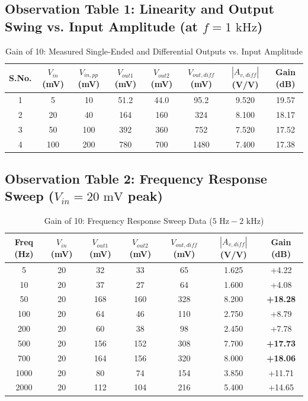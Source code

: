 \documentclass[11pt,a4paper]{article}
\begin{document}
\subsection{Observation Table 1: Linearity and Output Swing vs. Input Amplitude (at $f = 1\text{ kHz}$)}
\begin{table}[H]
\centering
\caption{Gain of 10: Measured Single-Ended and Differential Outputs vs. Input Amplitude}
\label{tab:gain10_vin}
\begin{tabular}{@{}cccccccc@{}}
\toprule
\textbf{S.No.} & \textbf{$V_{in}$ (mV)} & \textbf{$V_{in,pp}$ (mV)} & \textbf{$V_{out1}$ (mV)} & \textbf{$V_{out2}$ (mV)} & \textbf{$V_{out,diff}$ (mV)} & \textbf{$|A_{v,diff}|$ (V/V)} & \textbf{Gain (dB)} \\ \midrule
1 & 5   & 10  & 51.2 & 44.0 & 95.2  & 9.520 & 19.57 \\
2 & 20  & 40  & 164  & 160  & 324   & 8.100 & 18.17 \\
3 & 50  & 100 & 392  & 360  & 752   & 7.520 & 17.52 \\
4 & 100 & 200 & 780  & 700  & 1480  & 7.400 & 17.38 \\ \bottomrule
\end{tabular}
\end{table}

\subsection{Observation Table 2: Frequency Response Sweep ($V_{in} = 20\text{ mV}$ peak)}
\begin{table}[H]
\centering
\caption{Gain of 10: Frequency Response Sweep Data ($5\text{ Hz} - 2\text{ kHz}$)}
\label{tab:gain10_freq}
\begin{tabular}{@{}ccccccc@{}}
\toprule
\textbf{Freq (Hz)} & \textbf{$V_{in}$ (mV)} & \textbf{$V_{out1}$ (mV)} & \textbf{$V_{out2}$ (mV)} & \textbf{$V_{out,diff}$ (mV)} & \textbf{$|A_{v,diff}|$ (V/V)} & \textbf{Gain (dB)} \\ \midrule
5    & 20 & 32  & 33  & 65  & 1.625 & +4.22 \\
10   & 20 & 37  & 27  & 64  & 1.600 & +4.08 \\
50   & 20 & 168 & 160 & 328 & 8.200 & \textbf{+18.28} \\
100  & 20 & 64  & 46  & 110 & 2.750 & +8.79 \\
200  & 20 & 60  & 38  & 98  & 2.450 & +7.78 \\
500  & 20 & 156 & 152 & 308 & 7.700 & \textbf{+17.73} \\
700  & 20 & 164 & 156 & 320 & 8.000 & \textbf{+18.06} \\
1000 & 20 & 80  & 74  & 154 & 3.850 & +11.71 \\
2000 & 20 & 112 & 104 & 216 & 5.400 & +14.65 \\ \bottomrule
\end{tabular}
\end{table}
\end{document}
